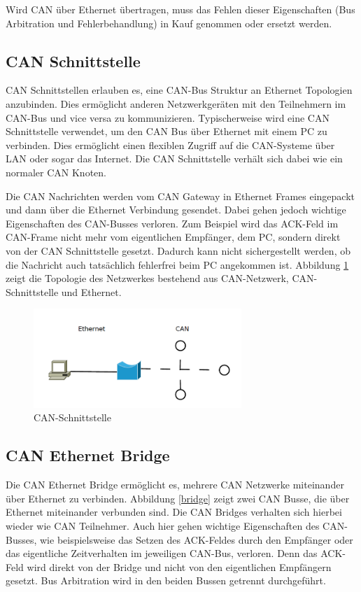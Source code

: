 Wird CAN über Ethernet übertragen, muss das Fehlen dieser Eigenschaften (Bus
Arbitration und Fehlerbehandlung) in Kauf genommen oder ersetzt werden.

\subsection{CAN Schnittstelle}
\label{l:interf}

CAN Schnittstellen erlauben es, eine CAN-Bus Struktur an Ethernet Topologien anzubinden. 
Dies ermöglicht anderen Netzwerkgeräten mit den Teilnehmern im CAN-Bus und vice versa 
zu kommunizieren. Typischerweise wird eine CAN Schnittstelle verwendet, um den CAN Bus 
über Ethernet mit einem PC zu verbinden. Dies ermöglicht einen flexiblen Zugriff auf die 
CAN-Systeme über LAN oder sogar das Internet. Die CAN Schnittstelle verhält sich dabei wie 
ein normaler CAN Knoten. \citep{STE}

Die CAN Nachrichten werden vom CAN Gateway in Ethernet Frames eingepackt und dann 
über die Ethernet Verbindung gesendet. Dabei gehen jedoch wichtige Eigenschaften des 
CAN-Busses verloren. Zum Beispiel wird das ACK-Feld im CAN-Frame nicht mehr vom 
eigentlichen Empfänger, dem PC, sondern direkt von der CAN Schnittstelle gesetzt. Dadurch 
kann nicht sichergestellt werden, ob die Nachricht auch tatsächlich fehlerfrei beim PC angekommen ist.
Abbildung \ref{gateway} zeigt die Topologie des Netzwerkes bestehend aus CAN-Netzwerk, 
CAN-Schnittstelle und Ethernet.

\begin{figure}[h] 
\centering
\includegraphics[width=0.7\textwidth]{figures/can_gateway}
\caption{CAN-Schnittstelle} 
\label{gateway}
\end{figure} 

\subsection{CAN Ethernet Bridge}
\label{l:bridge}

Die CAN Ethernet Bridge ermöglicht es, mehrere CAN Netzwerke miteinander über Ethernet 
zu verbinden. Abbildung \ref{bridge} zeigt zwei CAN Busse, die über 
Ethernet miteinander verbunden sind. Die CAN Bridges verhalten sich hierbei wieder wie 
CAN Teilnehmer. Auch hier gehen wichtige Eigenschaften des CAN-Busses, wie beispielsweise 
das Setzen des ACK-Feldes durch den Empfänger oder das eigentliche Zeitverhalten im 
jeweiligen CAN-Bus, verloren. Denn das ACK-Feld wird direkt von der Bridge und nicht von 
den eigentlichen Empfängern gesetzt. Bus Arbitration wird in den beiden Bussen
getrennt durchgeführt.

